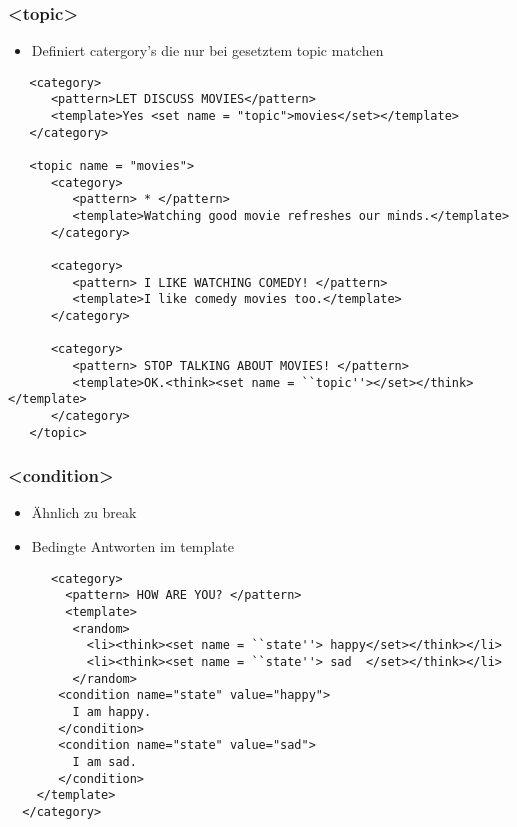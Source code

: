 \documentclass[9pt]{beamer}
\begin{document}
\begin{frame}[fragile]
  \frametitle{\textless topic\textgreater}
\begin{itemize}
  \item Definiert catergory's die nur bei gesetztem topic matchen
\end{itemize}
\begin{lstlisting}
   <category>
      <pattern>LET DISCUSS MOVIES</pattern>
      <template>Yes <set name = "topic">movies</set></template>  
   </category>
   
   <topic name = "movies">
      <category>
         <pattern> * </pattern>
         <template>Watching good movie refreshes our minds.</template>
      </category>
      
      <category>
         <pattern> I LIKE WATCHING COMEDY! </pattern>
         <template>I like comedy movies too.</template>
      </category>
      
      <category>
         <pattern> STOP TALKING ABOUT MOVIES! </pattern>
         <template>OK.<think><set name = ``topic''></set></think></template>
      </category>
   </topic>
\end{lstlisting}
\end{frame}

\begin{frame}[fragile]
  \frametitle{\textless condition\textgreater}
\begin{itemize}
\item Ähnlich zu break
\item Bedingte Antworten im template
    \end{itemize}
      \begin{lstlisting}
      <category>  
        <pattern> HOW ARE YOU? </pattern>  
        <template>  
         <random>                                                                                           
           <li><think><set name = ``state''> happy</set></think></li>                           
           <li><think><set name = ``state''> sad  </set></think></li>                             
         </random>
       <condition name="state" value="happy">
         I am happy.
       </condition>
       <condition name="state" value="sad">
         I am sad.
       </condition>
    </template>
  </category>
	\end{lstlisting}
\end{frame}
\end{document}
